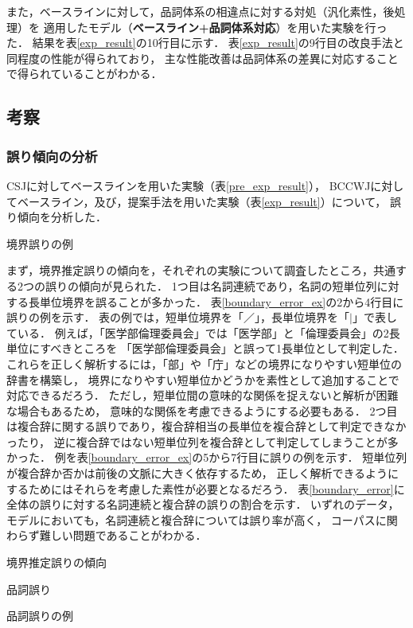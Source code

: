 \documentclass[japanese]{jnlp_1.4}
\begin{document}
また，ベースラインに対して，品詞体系の相違点に対する対処（汎化素性，後処理）を
適用したモデル（{\bf ベースライン+品詞体系対応}）を用いた実験を行った．
結果を表\ref{exp_result}の10行目に示す．
表\ref{exp_result}の9行目の改良手法と同程度の性能が得られており，
主な性能改善は品詞体系の差異に対応することで得られていることがわかる．


\subsection{考察}

\subsubsection{誤り傾向の分析}

CSJに対してベースラインを用いた実験（表\ref{pre_exp_result}），
BCCWJに対してベースライン，及び，提案手法を用いた実験（表\ref{exp_result}）について，
誤り傾向を分析した．

\begin{table}[b]
\caption{境界誤りの例}
\label{boundary_error_ex}

\end{table}

まず，境界推定誤りの傾向を，それぞれの実験について調査したところ，共通する2つの誤りの傾向が見られた．
1つ目は名詞連続であり，名詞の短単位列に対する長単位境界を誤ることが多かった．
表\ref{boundary_error_ex}の2から4行目に誤りの例を示す．
表の例では，短単位境界を「／」，長単位境界を「$|$」で表している．
例えば，「医学部倫理委員会」では「医学部」と「倫理委員会」の2長単位にすべきところを
「医学部倫理委員会」と誤って1長単位として判定した．
これらを正しく解析するには，「部」や「庁」などの境界になりやすい短単位の辞書を構築し，
境界になりやすい短単位かどうかを素性として追加することで対応できるだろう．
ただし，短単位間の意味的な関係を捉えないと解析が困難な場合もあるため，
意味的な関係を考慮できるようにする必要もある．
2つ目は複合辞に関する誤りであり，複合辞相当の長単位を複合辞として判定できなかったり，
逆に複合辞ではない短単位列を複合辞として判定してしまうことが多かった．
例を表\ref{boundary_error_ex}の5から7行目に誤りの例を示す．
短単位列が複合辞か否かは前後の文脈に大きく依存するため，
正しく解析できるようにするためにはそれらを考慮した素性が必要となるだろう．
表\ref{boundary_error}に全体の誤りに対する名詞連続と複合辞の誤りの割合を示す．
いずれのデータ，モデルにおいても，名詞連続と複合辞については誤り率が高く，
コーパスに関わらず難しい問題であることがわかる．

\begin{table}[b]
\caption{境界推定誤りの傾向}
\label{boundary_error}

\end{table} 
\begin{table}[b]
\caption{品詞誤り}
\label{pos_error}

\end{table}
\begin{table}[b]
\caption{品詞誤りの例}
\label{pos_error_exmaple}

\end{table}
\end{document}
